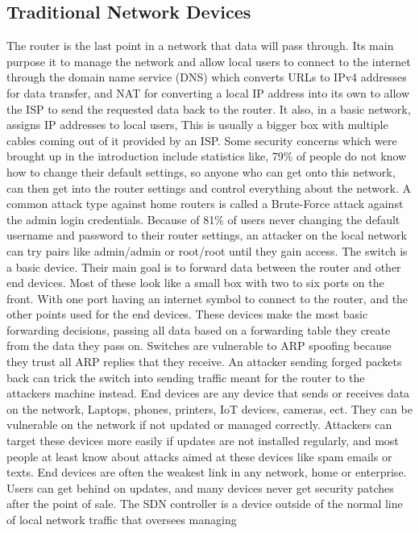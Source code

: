 \documentclass[12pt]{article}
\begin{document}
\subsection{Traditional Network Devices}
The router is the last point in a network that data will pass through. Its main purpose it to manage the 
network and allow local users to connect to the internet through the domain name service (DNS) which 
converts URLs to IPv4 addresses for data transfer, and NAT for converting a local IP address into its 
own to allow the ISP to send the requested data back to the router. It also, in a basic network, assigns 
IP addresses to local users, This is usually a bigger box with multiple cables coming out of it provided 
by an ISP. Some security concerns which were brought up in the introduction include statistics like, 79\% 
of people do not know how to change their default settings, so anyone who can get onto this network, can 
then get into the router settings and control everything about the network. A common attack type against 
home routers is called a Brute-Force attack against the admin login credentials. Because of 81\% of users 
never changing the default username and password to their router settings, an attacker on the local network 
can try pairs like admin/admin or root/root until they gain access. 
The switch is a basic device. Their main goal is to forward data between the router and other end devices. 
Most of these look like a small box with two to six ports on the front. With one port having an internet 
symbol to connect to the router, and the other points used for the end devices. These devices make the most 
basic forwarding decisions, passing all data based on a forwarding table they create from the data they 
pass on. Switches are vulnerable to ARP spoofing because they trust all ARP replies that they receive. An 
attacker sending forged packets back can trick the switch into sending traffic meant for the router to the 
attackers machine instead. 
End devices are any device that sends or receives data on the network, Laptops, phones, printers, IoT 
devices, cameras, ect. They can be vulnerable on the network if not updated or managed correctly. 
Attackers can target these devices more easily if updates are not installed regularly, and most people at 
least know about attacks aimed at these devices like spam emails or texts. End devices are often the weakest 
link in any network, home or enterprise. Users can get behind on updates, and many devices never get 
security patches after the point of sale. 
The SDN controller is a device outside of the normal line of local network traffic that oversees managing 
\end{document}

